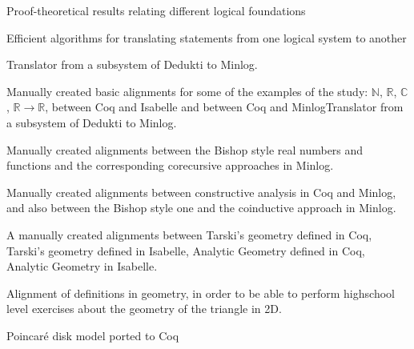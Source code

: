 \begin{workpackage}
\begin{wpdelivs}
  \begin{wpdeliv}[due=3,miles=startup,id=prooftheoretical,dissem=PU,nature=DEM,lead=Lee]
    {Proof-theoretical results relating different logical foundations}
  \end{wpdeliv}
  \begin{wpdeliv}[due=3,miles=startup,id=translatingstatements,dissem=PU,nature=DEM,lead=Lee]
    {Efficient algorithms for translating statements from one logical system to another}
  \end{wpdeliv}
  \begin{wpdeliv}[due=3,miles=startup,id=deduktitominilog,dissem=PU,nature=DEM,lead=Lmu]
    {Translator from a subsystem of Dedukti to Minlog. }
  \end{wpdeliv}
  \begin{wpdeliv}[due=3,miles=startup,id=aligningnumbers,dissem=PU,nature=DEM,lead=Str]
    {Manually created basic alignments for some of the examples of the
      study: $\mathbb{N}$, $\mathbb{R}$, $\mathbb{C}$, $\mathbb{R}
      \rightarrow \mathbb{R}$, between Coq and Isabelle and between
      Coq and MinlogTranslator from a subsystem of Dedukti to
      Minlog.}
  \end{wpdeliv}
  \begin{wpdeliv}[due=3,miles=startup,id=aligningnumbersminilog,dissem=PU,nature=DEM,lead=Lmu]
    {Manually created alignments between the Bishop style real numbers
      and functions and the corresponding corecursive approaches in
      Minlog.}
  \end{wpdeliv}
  \begin{wpdeliv}[due=3,miles=startup,id=aligningconstructiveanalysisminilog,dissem=PU,nature=DEM,lead=Lmu]
    {Manually created alignments between constructive analysis in Coq
      and Minlog, and also between the Bishop style one and the
      coinductive approach in Minlog.}
  \end{wpdeliv}
  \begin{wpdeliv}[due=3,miles=startup,id=aligninggeometries,dissem=PU,nature=DEM,lead=Bel]
    {A manually created alignments between Tarski's geometry defined
      in Coq, Tarski's geometry defined in Isabelle, Analytic Geometry
      defined in Coq, Analytic Geometry in Isabelle.}
  \end{wpdeliv}
  \begin{wpdeliv}[due=3,miles=startup,id=aligninggeometrieshighschool,dissem=PU,nature=DEM,lead=Str]
    {Alignment of definitions in geometry, in order to be able to
      perform highschool level exercises about the geometry of the
      triangle in 2D.}
  \end{wpdeliv}
  \begin{wpdeliv}[due=3,miles=startup,id=aligningpoincare,dissem=PU,nature=DEM,lead=Bel]
    {Poincar\'e disk model ported to Coq}
  \end{wpdeliv}


\end{wpdelivs}
\end{workpackage}
